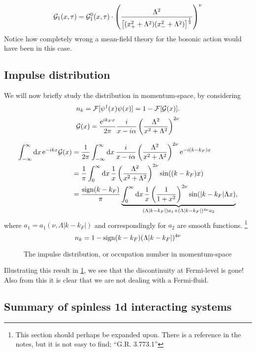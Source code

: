 \begin{equation}
\mathcal{G}_1(x, \tau) = \mathcal{G}_1^0(x, \tau)\cdot\left(\frac{\Lambda^2}{\left[(x_+^2+\Lambda^2)(x_-^2+\Lambda^2)\right]^{\frac12}}\right)^\nu
\end{equation}
Notice how completely wrong a mean-field theory for the bosonic action would have been in this case.

\subsection{Impulse distribution} %
We will now briefly study the distribution in momentum-space, by considering
\begin{equation*}
n_k = \mathcal{F}[\psi^\dagger(x)\psi(x)] = 1-\mathcal{F}[\mathcal{G}(x)].
\end{equation*}
\[\mathcal{G}(x) = \frac{\mathrm{e}^{ik_Fx}}{2\pi}\frac{i}{x-i\alpha}\left(\frac{\Lambda^2}{x^2+\Lambda^2}\right)^{2\nu}\]

\begin{align*}
\int_{-\infty}^\infty\dd{x}\mathrm{e}^{-ikx}\mathcal{G}(x) &= \frac{1}{2\pi}\int_{-\infty}^\infty\dd{x}\frac{i}{x-i\alpha}\left(\frac{\Lambda^2}{x^2+\Lambda^2}\right)^{2\nu}\mathrm{e}^{-i(k-k_F)x} \\
&= \frac{1}{\pi}\int_0^\infty\dd{x}\frac{1}{x}\left(\frac{\Lambda^2}{x^2+\Lambda^2}\right)^{2\nu}\sin((k-k_F)x)\\
&= \frac{\text{sign}(k-k_F)}{\pi}\underbrace{\int_0^\infty\dd{x}\frac1x\left(\frac{1}{1+x^2}\right)^{2\nu}\sin(|k-k_F|\Lambda x)}_{(\Lambda|k-k_F|)a_1 + (\Lambda|k-k_F|)^{4\nu}a_2},
\end{align*}
where \(a_1 = a_1(\nu, \Lambda|k-k_F|)\) and correspondingly for \(a_2\) are smooth functions. \footnote{This section should perhaps be expanded upon. There is a reference in the notes, but it is not easy to find; ``G.R. 3.773.1''}
\begin{equation}
n_k = 1-\text{sign}(k-k_F)(\Lambda|k-k_F|)^{4\nu}
\end{equation}
\begin{figure}
	\centering
	
	\caption{The impulse distribution, or occupation number in momentum-space}
	\label{fig:occupation_k}
\end{figure}
Illustrating this result in \cref{fig:occupation_k}, we see that the discontinuity at Fermi-level is gone! Also from this it is clear that we are not dealing with a Fermi-fluid.

\subsection[Summary]{Summary of spinless 1d interacting systems} %

